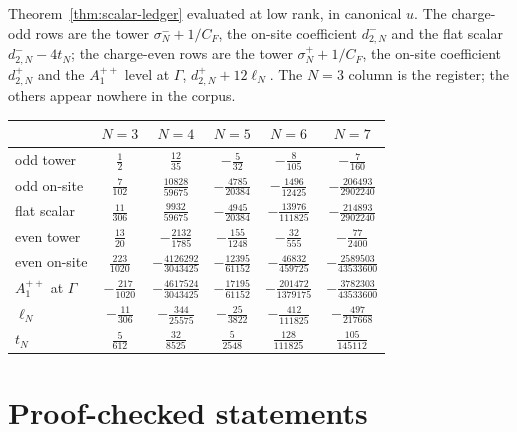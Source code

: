 \documentclass[11pt]{article}
\theoremstyle{plain}
\theoremstyle{definition}
\theoremstyle{remark}
\newcommand{\chk}[1]{}
\newcommand{\CF}{C_F}
\begin{document}
Theorem~\ref{thm:scalar-ledger} evaluated at low rank, in canonical $u$. The
charge-odd rows are the tower $\sigma^-_N+1/\CF$, the on-site coefficient
$d^-_{2,N}$ and the flat scalar $d^-_{2,N}-4t_N$; the charge-even rows are the
tower $\sigma^+_N+1/\CF$, the on-site coefficient $d^+_{2,N}$ and the
$A_1^{++}$ level at $\Gamma$, $d^+_{2,N}+12\ell_N$. The $N=3$ column is the
register; the others appear nowhere in the corpus.

\begin{center}
\small
\begin{tabular}{@{}lccccc@{}}
\toprule
 & $N=3$ & $N=4$ & $N=5$ & $N=6$ & $N=7$\\
\midrule
odd tower & $\tfrac{1}{2}$ & $\tfrac{12}{35}$ & $-\tfrac{5}{32}$ & $-\tfrac{8}{105}$ & $-\tfrac{7}{160}$\\
odd on-site & $\tfrac{7}{102}$ & $\tfrac{10828}{59675}$ & $-\tfrac{4785}{20384}$ & $-\tfrac{1496}{12425}$ & $-\tfrac{206493}{2902240}$\\
flat scalar & $\tfrac{11}{306}$ & $\tfrac{9932}{59675}$ & $-\tfrac{4945}{20384}$ & $-\tfrac{13976}{111825}$ & $-\tfrac{214893}{2902240}$\\
\midrule
even tower & $\tfrac{13}{20}$ & $-\tfrac{2132}{1785}$ & $-\tfrac{155}{1248}$ & $-\tfrac{32}{555}$ & $-\tfrac{77}{2400}$\\
even on-site & $\tfrac{223}{1020}$ & $-\tfrac{4126292}{3043425}$ & $-\tfrac{12395}{61152}$ & $-\tfrac{46832}{459725}$ & $-\tfrac{2589503}{43533600}$\\
$A_1^{++}$ at $\Gamma$ & $-\tfrac{217}{1020}$ & $-\tfrac{4617524}{3043425}$ & $-\tfrac{17195}{61152}$ & $-\tfrac{201472}{1379175}$ & $-\tfrac{3782303}{43533600}$\\
\midrule
$\ell_N$ & $-\tfrac{11}{306}$ & $-\tfrac{344}{25575}$ & $-\tfrac{25}{3822}$ & $-\tfrac{412}{111825}$ & $-\tfrac{497}{217668}$\\
$t_N$ & $\tfrac{5}{612}$ & $\tfrac{32}{8525}$ & $\tfrac{5}{2548}$ & $\tfrac{128}{111825}$ & $\tfrac{105}{145112}$\\
\bottomrule
\end{tabular}
\end{center}
\chk{the second-order on-site scalar is closed form at every rank: same-face route + 1/C\_F + 12 ell\_N, and L cancels}
\chk{the charge-even second-order symbol is ell\_N times the unsigned incidence: the vacuum route cancels the doubly-excited route on every link-disjoint pair}

\section{Proof-checked statements}\label{app:lean}
\end{document}
